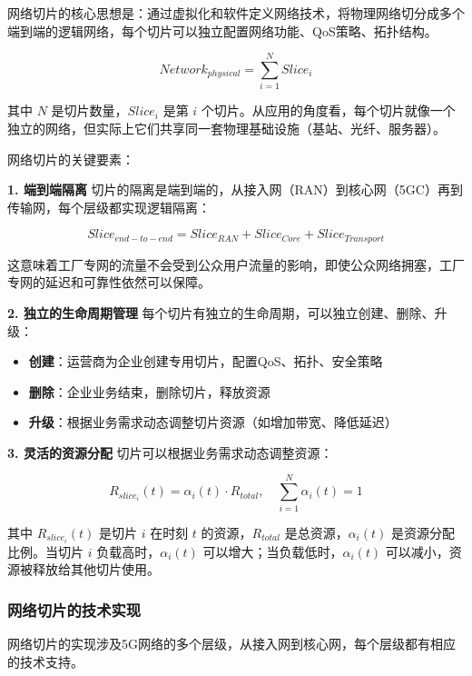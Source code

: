 网络切片的核心思想是：通过虚拟化和软件定义网络技术，将物理网络切分成多个端到端的逻辑网络，每个切片可以独立配置网络功能、QoS策略、拓扑结构。

\begin{equation}
Network_{physical} = \sum_{i=1}^{N} Slice_i
\end{equation}

其中 $N$ 是切片数量，$Slice_i$ 是第 $i$ 个切片。从应用的角度看，每个切片就像一个独立的网络，但实际上它们共享同一套物理基础设施（基站、光纤、服务器）。

网络切片的关键要素：

\textbf{1. 端到端隔离}
切片的隔离是端到端的，从接入网（RAN）到核心网（5GC）再到传输网，每个层级都实现逻辑隔离：

\begin{equation}
Slice_{end-to-end} = Slice_{RAN} + Slice_{Core} + Slice_{Transport}
\end{equation}

这意味着工厂专网的流量不会受到公众用户流量的影响，即使公众网络拥塞，工厂专网的延迟和可靠性依然可以保障。

\textbf{2. 独立的生命周期管理}
每个切片有独立的生命周期，可以独立创建、删除、升级：

\begin{itemize}
    \item \textbf{创建}：运营商为企业创建专用切片，配置QoS、拓扑、安全策略
    \item \textbf{删除}：企业业务结束，删除切片，释放资源
    \item \textbf{升级}：根据业务需求动态调整切片资源（如增加带宽、降低延迟）
\end{itemize}

\textbf{3. 灵活的资源分配}
切片可以根据业务需求动态调整资源：

\begin{equation}
R_{slice_i}(t) = \alpha_i(t) \cdot R_{total}, \quad \sum_{i=1}^{N} \alpha_i(t) = 1
\end{equation}

其中 $R_{slice_i}(t)$ 是切片 $i$ 在时刻 $t$ 的资源，$R_{total}$ 是总资源，$\alpha_i(t)$ 是资源分配比例。当切片 $i$ 负载高时，$\alpha_i(t)$ 可以增大；当负载低时，$\alpha_i(t)$ 可以减小，资源被释放给其他切片使用。

\subsubsection{网络切片的技术实现}

网络切片的实现涉及5G网络的多个层级，从接入网到核心网，每个层级都有相应的技术支持。

